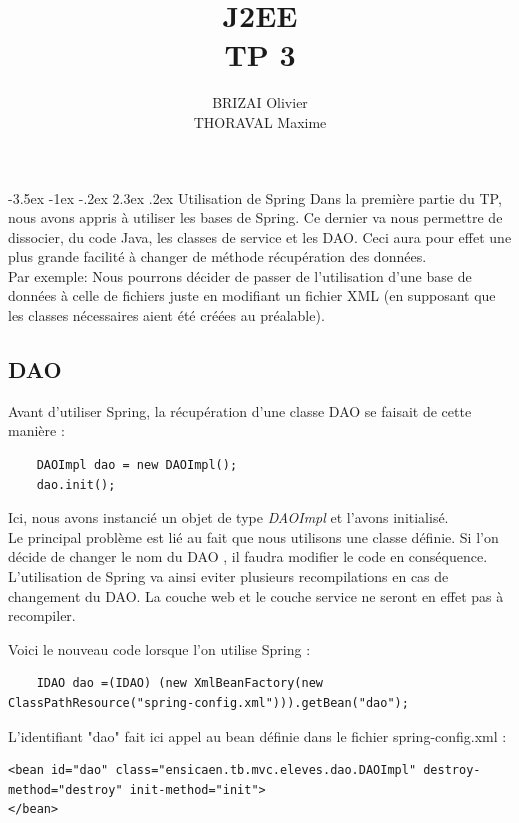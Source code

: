 \documentclass[a4paper,12pt]{article}
\makeatletter
\renewcommand\section{\@startsection {section}{1}{\z@}%
                           {-3.5ex \@plus -1ex \@minus -.2ex}%
                           {2.3ex \@plus.2ex}%
                           {\normalfont\Large\bfseries}}
\makeatother
\begin{document}
\newpage
\title{J2EE\\TP 3}
\date{}
\author{BRIZAI Olivier\\THORAVAL Maxime}
\maketitle


\section{Utilisation de Spring}
Dans la première partie du TP, nous avons appris à utiliser les bases de Spring. Ce dernier va nous permettre de dissocier, du code Java, 
les classes de service et les DAO. Ceci aura pour effet une plus grande facilité à changer de méthode récupération des données.\\
Par exemple: Nous pourrons décider de passer de l'utilisation d'une base de données à celle de fichiers juste en modifiant un fichier XML 
(en supposant que les classes nécessaires aient été créées au préalable).

\subsection{DAO}
Avant d'utiliser Spring, la récupération d'une classe DAO se faisait de cette manière :
\begin{lstlisting}
	DAOImpl dao = new DAOImpl();
	dao.init();
\end{lstlisting}
Ici, nous avons instancié un objet de type \textit{DAOImpl} et l'avons initialisé.\\
Le principal problème est lié au fait que nous utilisons une classe définie. Si l'on décide de changer le nom du DAO , il faudra modifier le code en conséquence. L'utilisation de Spring va ainsi eviter plusieurs recompilations en cas de changement du DAO. La couche web et le couche service ne seront en effet pas à recompiler.

Voici le nouveau code lorsque l'on utilise Spring :

\begin{lstlisting}
	IDAO dao =(IDAO) (new XmlBeanFactory(new ClassPathResource("spring-config.xml"))).getBean("dao");
\end{lstlisting}

L'identifiant "dao" fait ici appel au bean définie dans le fichier spring-config.xml :

\begin{lstlisting}
<bean id="dao" class="ensicaen.tb.mvc.eleves.dao.DAOImpl" destroy-method="destroy" init-method="init">
</bean>
\end{lstlisting}
\end{document}
